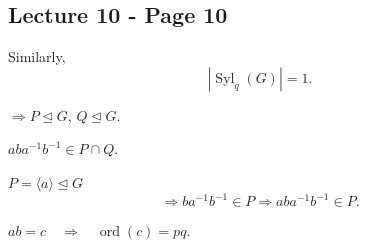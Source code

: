 
\subsection*{Lecture 10 - Page 10}

\noindent Similarly,
\[
|\operatorname{Syl}_q(G)|=1.
\]

\noindent $\Longrightarrow P\trianglelefteq G$, $Q\trianglelefteq G$.

\medskip
\noindent $aba^{-1}b^{-1}\in P\cap Q$.

\medskip
\noindent $P=\langle a\rangle\trianglelefteq G$
\[
\Longrightarrow ba^{-1}b^{-1}\in P
\Longrightarrow aba^{-1}b^{-1}\in P.
\]

\noindent $ab=c\quad\Longrightarrow\quad\operatorname{ord}(c)=pq$.

